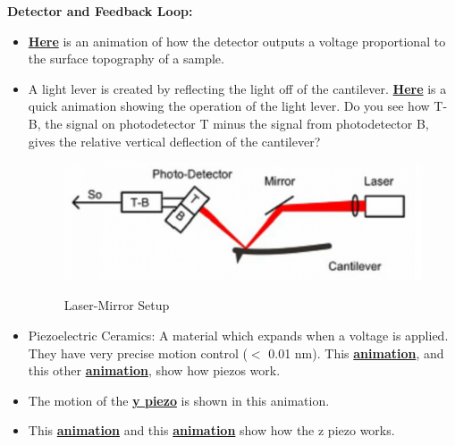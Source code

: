 \documentclass{../lab}
\begin{document}
\textbf{Detector and Feedback Loop:}

\begin{itemize}
    \item \href{http://experimentationlab.berkeley.edu/sites/default/files/AFMImages/2.1.\%20photodetector.flv\_converted.mp4}{\textbf{Here}} is an animation of how the detector outputs a voltage proportional to the surface topography of a sample.

    \item A light lever is created by reflecting the light off of the cantilever.  \href{http://experimentationlab.berkeley.edu/sites/default/files/AFMImages/2.3.\%20Light\%20Lever.flv\_converted.mp4}{\textbf{Here}} is a quick animation showing the operation of the light lever. Do you see how T-B, the signal on photodetector T minus the signal from photodetector B, gives the relative vertical deflection of the cantilever?
    \begin{figure}[h]
        \centering
        \href{http://experimentationlab.berkeley.edu/sites/default/files/AFMImages/AFMlasermirror.png}{\includegraphics[width=0.5\linewidth]{images/AFMlasermirror.png}}
        \caption{Laser-Mirror Setup}
        \label{fig:AFMlasermirror}
    \end{figure}

    \item Piezoelectric Ceramics:  A material which expands when a voltage is applied.  They have very precise motion control ($<$ 0.01 nm).  This \href{http://experimentationlab.berkeley.edu/sites/default/files/AFMImages/3.1.\%20Motion.flv\_converted.mp4}{\textbf{animation}}, and this other \href{http://experimentationlab.berkeley.edu/sites/default/files/AFMImages/3.2.\%20proportional.flv\_converted.mp4}{\textbf{animation}}, show how piezos work.

    \item The motion of the \href{http://experimentationlab.berkeley.edu/sites/default/files/AFMImages/3.3.\%20Y\%20Scanner\_converted.mp4}{\textbf{y piezo}} is shown in this animation.

    \item This \href{http://experimentationlab.berkeley.edu/sites/default/files/AFMImages/3.4.\%20Z\%20Scanner.flv\_converted.mp4}{\textbf{animation}} and this\textbf{ }\href{http://experimentationlab.berkeley.edu/sites/default/files/AFMImages/4.1.\%20Z\%20motion.flv\_converted.mp4}{\textbf{animation}} show how the z piezo works.


\end{itemize}
\end{document}

